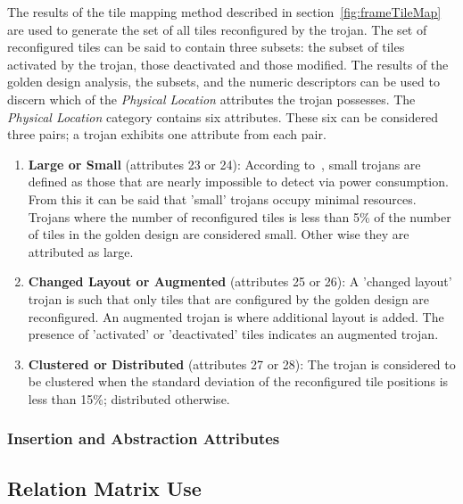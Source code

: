 The results of the tile mapping method described in section~\ref{fig:frameTileMap} are used to generate the set of all tiles reconfigured by the trojan.
The set of reconfigured tiles can be said to contain three subsets: the subset of tiles activated by the trojan, those deactivated and those modified. 
The results of the golden design analysis, the subsets, and the numeric descriptors can be used to discern which of the \textit{Physical Location} attributes the trojan possesses. 
The \textit{Physical Location} category contains six attributes.
These six can be considered three pairs; a trojan exhibits one attribute from each pair. 
\begin{enumerate}
	\item \textbf{Large or Small} (attributes 23 or 24): According to~\cite{samerAttribute}, small trojans are defined as those that are nearly impossible to detect via power consumption. From this it can be said that 'small' trojans occupy minimal resources. Trojans where the number of reconfigured tiles is less than 5\% of the number of tiles in the golden design are considered small. Other wise they are attributed as large.
	\item \textbf{Changed Layout or Augmented} (attributes 25 or 26): A 'changed layout' trojan is such that only tiles that are configured by the golden design are reconfigured. An augmented trojan is where additional layout is added. The presence of 'activated' or 'deactivated' tiles indicates an augmented trojan. 
	\item \textbf{Clustered or Distributed} (attributes 27 or 28): The trojan is considered to be clustered when the standard deviation of the reconfigured tile positions is less than 15\%; distributed otherwise.
\end{enumerate}
\subsubsection{Insertion and Abstraction Attributes}
\subsection{Relation Matrix Use}

